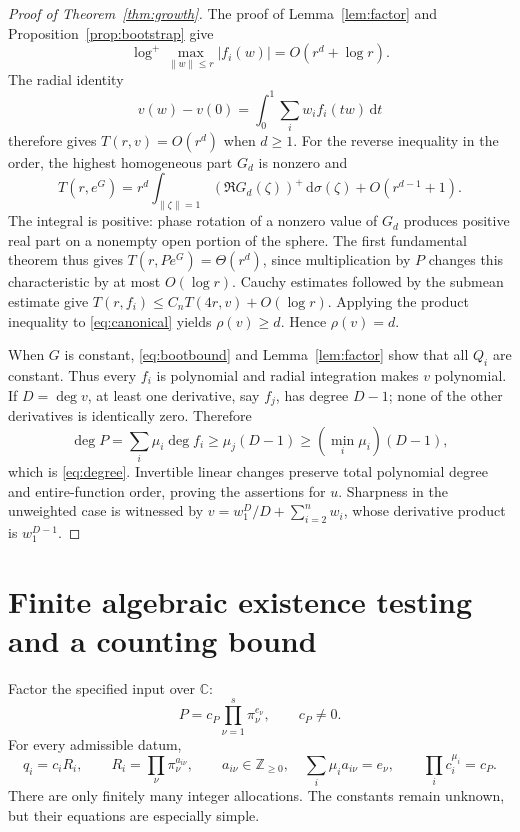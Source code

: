 \documentclass[11pt]{article}
\numberwithin{equation}{section}
\theoremstyle{definition}\newtheorem{definition}[theorem]{Definition}
\theoremstyle{remark}\newtheorem{remark}[theorem]{Remark}
\newcommand{\C}{\mathbb C}
\newcommand{\NN}{\mathbb Z_{\geq0}}
\newcommand{\dd}{\,\mathrm d}
\begin{document}
\begin{proof}[Proof of Theorem~\ref{thm:growth}]
The proof of Lemma~\ref{lem:factor} and Proposition~\ref{prop:bootstrap}
give
\[
 \log^+\max_{\|w\|\leq r}|f_i(w)|=O(r^d+\log r).
\]
The radial identity
\[
 v(w)-v(0)=\int_0^1\sum_iw_if_i(tw)\dd t
\]
therefore gives $T(r,v)=O(r^d)$ when $d\geq1$.
For the reverse inequality in the order, the highest homogeneous part
$G_d$ is nonzero and
\[
 T(r,e^G)=r^d\int_{\|\zeta\|=1}(\Re G_d(\zeta))^+\dd\sigma(\zeta)
          +O(r^{d-1}+1).
\]
The integral is positive: phase rotation of a nonzero value of $G_d$
produces positive real part on a nonempty open portion of the sphere.
The first fundamental theorem thus gives
$T(r,Pe^G)=\Theta(r^d)$, since multiplication by $P$ changes this
characteristic by at most $O(\log r)$. Cauchy estimates followed by the
submean estimate give
$T(r,f_i)\leq C_nT(4r,v)+O(\log r)$. Applying the product inequality to
\eqref{eq:canonical} yields $\rho(v)\geq d$. Hence $\rho(v)=d$.

When $G$ is constant, \eqref{eq:bootbound} and
Lemma~\ref{lem:factor} show that all $Q_i$ are constant. Thus every
$f_i$ is polynomial and radial integration makes $v$ polynomial.
If $D=\deg v$, at least one derivative, say $f_j$, has degree $D-1$;
none of the other derivatives is identically zero. Therefore
\[
 \deg P=\sum_i\mu_i\deg f_i\geq\mu_j(D-1)
 \geq(\min_i\mu_i)(D-1),
\]
which is \eqref{eq:degree}. Invertible linear changes preserve total
polynomial degree and entire-function order, proving the assertions for
$u$. Sharpness in the unweighted case is witnessed by
$v=w_1^{D}/D+\sum_{i=2}^n w_i$, whose derivative product is $w_1^{D-1}$.
\end{proof}

\section{Finite algebraic existence testing and a counting bound}
Factor the specified input over $\C$:
\begin{equation}\label{eq:inputfactor}
 P=c_P\prod_{\nu=1}^s\pi_\nu^{e_\nu},\qquad c_P\ne0.
\end{equation}
For every admissible datum,
\begin{equation}\label{eq:allocation}
 q_i=c_iR_i,\qquad
 R_i=\prod_\nu\pi_\nu^{a_{i\nu}},\qquad
 a_{i\nu}\in\NN,\quad \sum_i\mu_i a_{i\nu}=e_\nu,\qquad
 \prod_i c_i^{\mu_i}=c_P.
\end{equation}
There are only finitely many integer allocations. The constants remain
unknown, but their equations are especially simple.
\end{document}
